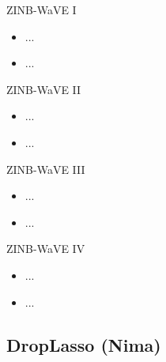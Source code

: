 \documentclass{beamer}
\begin{document}
\begin{frame}{ZINB-WaVE I}

\begin{itemize}
  \itemsep12pt
  \item ...
  \item ...
\end{itemize}

\end{frame}

\begin{frame}{ZINB-WaVE II}

\begin{itemize}
  \itemsep12pt
  \item ...
  \item ...
\end{itemize}

\end{frame}


\begin{frame}{ZINB-WaVE III}

\begin{itemize}
  \itemsep12pt
  \item ...
  \item ...
\end{itemize}

\end{frame}


\begin{frame}{ZINB-WaVE IV}

\begin{itemize}
  \itemsep12pt
  \item ...
  \item ...
\end{itemize}

\end{frame}

\subsection{DropLasso (Nima)}
\end{document}
